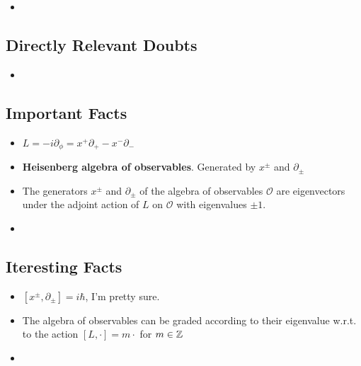 \documentclass{article}
\begin{document}
    \begin{itemize}

    \item 
    
    \end{itemize}

\subsection*{Directly Relevant Doubts}

    \begin{itemize}

    \item 
    
    \end{itemize}
    
\subsection*{Important Facts}

    \begin{itemize}

    \item $L = - i \partial_\phi = x^+ \partial_+ - x^- \partial_-$
    
    \item \textbf{Heisenberg algebra of observables}. Generated by $x^\pm$ and $\partial_\pm$
    
    \item The generators $x^\pm$ and $\partial_\pm$ of the algebra of observables $\mathcal O$ are eigenvectors under the adjoint action of $L$ on $\mathcal O$ with eigenvalues $\pm 1$.
    
    \item 
    
    \end{itemize}

\subsection*{Iteresting Facts}

    \begin{itemize}

    \item $[x^\pm, \partial_\pm] = i \hbar$, I'm pretty sure.
    
    \item The algebra of observables can be graded according to their eigenvalue w.r.t. to the action $[L, \cdot] = m \cdot$ for $m \in \mathbb{Z}$
    
    \item 
    
    \end{itemize}
\end{document}
